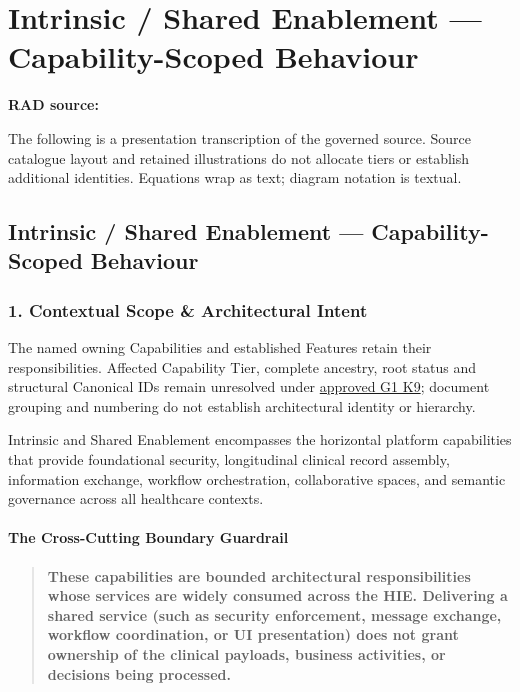 \chapter{Intrinsic / Shared Enablement — Capability-Scoped Behaviour}\label{rad:ise}
\noindent\textbf{RAD source:} \texttt{}

The following is a presentation transcription of the governed source. Source catalogue layout and retained illustrations do not allocate tiers or establish additional identities. Equations wrap as text; diagram notation is textual.

\label{rad:ise:1}
\section*{Intrinsic /\allowbreak{} Shared Enablement — Capability-Scoped Behaviour}
\label{rad:ise:3}
\subsection*{1. Contextual Scope \& Architectural Intent}
\label{rad:ise:5}

The named owning Capabilities and established Features retain their responsibilities. Affected Capability Tier, complete ancestry, root status and structural Canonical IDs remain unresolved under \hyperref[rad:k9:1392]{approved G1 K9}; document grouping and numbering do not establish architectural identity or hierarchy.

\label{rad:ise:7}

Intrinsic and Shared Enablement encompasses the horizontal platform capabilities that provide foundational security, longitudinal clinical record assembly, information exchange, workflow orchestration, collaborative spaces, and semantic governance across all healthcare contexts.

\label{rad:ise:9}
\subsubsection*{The Cross-Cutting Boundary Guardrail}
\label{rad:ise:10}

\begin{quote}

\textbf{These capabilities are bounded architectural responsibilities whose services are widely consumed across the HIE. Delivering a shared service (such as security enforcement, message exchange, workflow coordination, or UI presentation) does not grant ownership of the clinical payloads, business activities, or decisions being processed.}


\end{quote}
\label{rad:ise:12}

